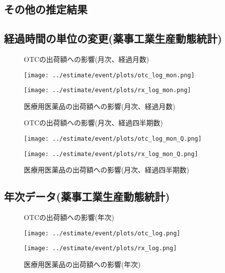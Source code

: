 \documentclass[a4paper,11pt,uplatex]{jsarticle}
\theoremstyle{definition}
\begin{document}

\begin{appendices}
    \def\thesection{付録\Alph{section}}
    \def\thesubsection{\Alph{section}.\arabic{subsection}}
    \section{その他の推定結果}\label{event_graph}
    \subsection{経過時間の単位の変更(薬事工業生産動態統計)}
    \begin{figure}[H]
        \centering
        \begin{minipage}{0.45\textwidth}
            \caption{OTCの出荷額への影響(月次、経過月数)}
            \centering
            \texttt{[image: ../estimate/event/plots/otc\_log\_mon.png]}
            \end{minipage}\hfill
            \begin{minipage}{0.45\textwidth}
                \caption{医療用医薬品の出荷額への影響(月次、経過月数)}
                \centering
                \texttt{[image: ../estimate/event/plots/rx\_log\_mon.png]}
            \end{minipage}
    \end{figure}
    \begin{figure}[H]
        \centering
        \begin{minipage}{0.45\textwidth}
            \caption{OTCの出荷額への影響(月次、経過四半期数)}
            \centering
            \texttt{[image: ../estimate/event/plots/otc\_log\_mon\_Q.png]}
        \end{minipage}\hfill
        \begin{minipage}{0.45\textwidth}
            \caption{医療用医薬品の出荷額への影響(月次、経過四半期数)}
            \centering
            \texttt{[image: ../estimate/event/plots/rx\_log\_mon\_Q.png]}
        \end{minipage}
    \end{figure}
    \subsection{年次データ(薬事工業生産動態統計)}
    \begin{figure}[H]
        \centering
        \begin{minipage}{0.45\textwidth}
            \caption{OTCの出荷額への影響(年次)}
            \centering
            \texttt{[image: ../estimate/event/plots/otc\_log.png]}
        \end{minipage}\hfill
        \begin{minipage}{0.45\textwidth}
            \caption{医療用医薬品の出荷額への影響(年次)}
            \centering
            \texttt{[image: ../estimate/event/plots/rx\_log.png]}
        \end{minipage}
    \end{figure}

\end{appendices}
\end{document}
